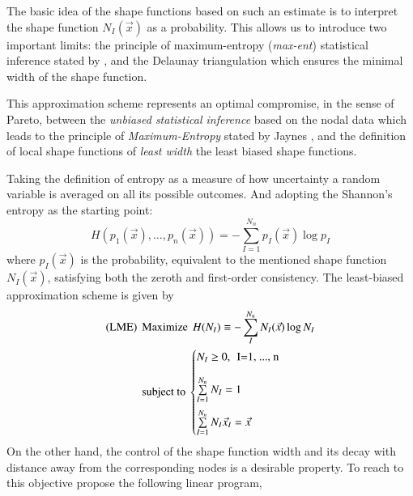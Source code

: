 \documentclass[preprint,12pt,a4paper]{elsarticle}
\begin{document}
The basic idea
of the shape functions based on such an estimate is to interpret the shape function $N_I(\vec{x})$ as a probability. This allows us to introduce two important limits:
the principle of maximum-entropy (\textit{max-ent}) statistical
inference stated by \cite{Jaynes1957}, and the Delaunay triangulation
which ensures the minimal width of the shape function. 

This approximation scheme represents an optimal compromise, in the sense of
Pareto, between the \textit{unbiased statistical inference} based on
the nodal data which leads to the principle of \textit{Maximum-Entropy}
stated by Jaynes \cite{Jaynes1957}, and the definition of local shape
functions of \textit{least width} the least biased shape functions.

Taking the definition of entropy as a measure of how uncertainty a
random variable is averaged on all its possible outcomes. And adopting
the Shannon's entropy as the starting point:
\begin{equation}
  \label{eq:Shannon-entropy}
  H(p_1(\vec{x}),\ldots,p_n(\vec{x})) = -\sum^{N_n}_{I=1}{p_I(\vec{x})\log p_I }
\end{equation}
where $p_I(\vec{x})$ is the probability, equivalent to the mentioned
shape function $N_I(\vec{x})$, satisfying both the zeroth and
first-order consistency. The least-biased approximation scheme is
given by
\begin{align*}
  \label{eq:least-biased-approximation-scheme}
  \text{(LME)} \hspace{0.15cm} &\text{Maximize} \hspace{0.15cm} H(N_I) \equiv
  -\sum_{I}^{N_n}{N_I(\vec{x})\log N_I }\\
  &\text{subject to}\
  \begin{cases}
    N_I \ge 0, \hspace{0.15cm} \text{I=1, ..., n} \\[1em]   
    \sum\limits_{I=1}^{N_n}{N_I} = 1 \\[1em]   
    \sum\limits_{I=1}^{N_n}{N_I \vec{x}_I} = \vec{x} \\
  \end{cases}
\end{align*}
On the other hand, the control of the shape function width and its
decay with distance away from the corresponding nodes is a desirable property. To reach to this objective \cite{Arroyo2006} propose the following linear program,
\end{document}
